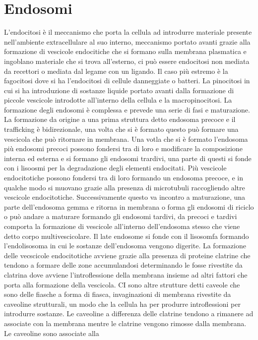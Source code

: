 \section{Endosomi}
L'endocitosi \`e il meccanismo che porta la cellula ad introdurre materiale presente nell'ambiente extracellulare al suo interno, meccanismo portato avanti grazie alla formazione di 
vescicole endocitiche che si formano sulla membrana plasmatica e ingoblano materiale che si trova all'esterno, ci pu\`o essere endocitosi non mediata da recettori o mediata dal legame
con un ligando. Il caso pi\`u estremo \`e la fagocitosi dove si ha l'endocitosi di cellule danneggiate o batteri. La pinocitosi in cui si ha introduzione di sostanze liquide portato 
avanti dalla formazione di piccole vescicole introdotte all'interno della cellula e la macropinocitosi. La formazione degli endosomi \`e complessa e prevede una serie di fasi e 
maturazione. La formazione da origine a una prima struttura detto endosoma precoce e il trafficking \`e bidirezionale, una volta che si \`e formato questo pu\`o formare una vescicola
che pu\`o ritornare in membrana. Una votla che si \`e formato l'endosoma pi\`u endosomi precoci possono fondersi tra di loro e modificare la composizione interna ed esterna e si 
formano gli endosomi trardivi, una parte di questi si fonde con i lisoosmi per la degradazione degli elementi endocitati. Pi\`u vescicole endocitotiche possono fondersi tra di loro
formando un endosoma precoce, e in qualche modo si muovano grazie alla presenza di microtubuli raccogliendo altre vescicole endocitotiche. Successivamente questo va incontro a 
maturazione, una parte dell'endosoma gemma e ritorna in membrana o forma gli endosomi di riciclo o pu\`o andare a maturare formando gli endosomi tardivi, da precoci e tardivi comporta
la formazione di vescicole all'interno dell'endosoma stesso che viene detto corpo multivescicolare. Il late endosome si fonde con il lisosomfa formando l'endolisosoma in cui le 
sostanze dell'endosoma vengono digerite. La formazione delle vecscicole endocitotiche avviene grazie alla presenza di proteine clatrine che tendono a formare delle zone accumulandosi
determinando le fosse rivestite da clatrina dove avviene l'introflessione della membrana insieme ad altri fattori che porta alla formazione della vescicola. CI sono altre strutture detti
caveole che sono delle fiasche a forma di fiasca, invaginazioni di membrana rivestite da caveoline strutturali, un modo che la cellula ha per produrre introflessioni per introdurre 
sostanze. Le caveoline a differenza delle clatrine tendono a rimanere ad associate con la membrana mentre le clatrine vengono rimosse dalla membrana. Le caveoline sono associate alla
